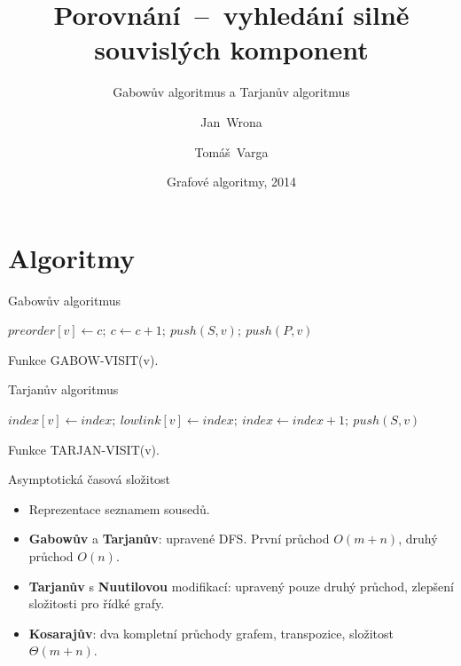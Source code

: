 \documentclass{beamer}
\title[Porovnání]{Porovnání\ --\ vyhledání silně souvislých komponent}
\subtitle{Gabowův algoritmus a Tarjanův algoritmus}
\author[Wrona, Varga]{Jan~Wrona \and Tomáš~Varga}
\institute[FIT VUT]
  {
    Fakulta informačních technologií\\
    Vysoké učení technické v Brně
  }
\date[GAL 2014]{Grafové algoritmy, 2014}
\begin{document}
\frame{\titlepage}

\section{Algoritmy}
\begin{frame}{Gabowův algoritmus}
\begin{algorithm}[H]
\scriptsize
\begin{algorithmic}
  \STATE $preorder[v] \leftarrow c;\ c \leftarrow c + 1;\ push(S, v);\ push(P, v)$
      \REPEAT
    \ENDIF
  \ENDFOR

  \bigskip

    \REPEAT
  \ENDIF
\end{algorithmic}
\caption{Funkce GABOW-VISIT(v).}
\label{alg:gabow}
\end{algorithm}
\end{frame}

\begin{frame}{Tarjanův algoritmus}
\begin{algorithm}[H]
\scriptsize
\begin{algorithmic}
  \STATE $index[v] \leftarrow index;\ lowlink[v] \leftarrow index;\ index \leftarrow index + 1;\ push(S, v)$
    \ENDIF
  \ENDFOR

  \bigskip

    \REPEAT
  \ENDIF
\end{algorithmic}
\caption{Funkce TARJAN-VISIT(v).}
\label{alg:tarjan}
\end{algorithm}
\end{frame}

\begin{frame}{Asymptotická časová složitost}
\begin{itemize}
\item Reprezentace seznamem sousedů.
\bigskip
\item \textbf{Gabowův} a \textbf{Tarjanův}: upravené DFS. První průchod $O(m+n)$, druhý průchod $O(n)$.
\item \textbf{Tarjanův} s \textbf{Nuutilovou} modifikací: upravený pouze druhý průchod, zlepšení složitosti pro řídké grafy.
\item \textbf{Kosarajův}: dva kompletní průchody grafem, transpozice, složitost $\Theta(m+n)$.
\end{itemize}
\end{frame}
\end{document}
